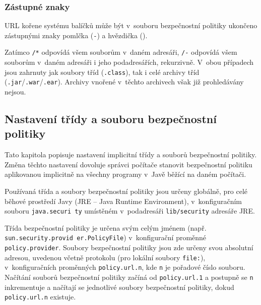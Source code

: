 \subsubsection{Zástupné znaky}

URL kořene systému balíčků může být v~souboru bezpečnostní politiky ukončeno zástupnými znaky pomlčka ({\tt -}) a hvězdička ({\tt *}).

Zatímco {\tt /*} odpovídá všem souborům v~daném adresáři, {\tt /-} odpovídá všem souborům v~daném adresáři i jeho podadresářích, rekurzivně.
V~obou případech jsou zahrnuty jak soubory tříd ({\tt .class}), tak i celé archivy tříd ({\tt .jar}/{\tt .war}/{\tt .ear}).
Archivy vnořené v~těchto archivech však již prohledávány nejsou.
\cite{jdkdocPolicyFiles}

\subsection{Nastavení třídy a souboru bezpečnostní politiky} \label{nastaveniPolitiky}

Tato kapitola popisuje nastavení implicitní třídy a souborů bezpečnostní politiky. Změna těchto nastavení dovoluje správci počítače
stanovit bezpečnostní politiku aplikovanou implicitně na všechny programy v~Javě běžící na daném počítači.

Používaná třída a soubory bezpečnostní politiky jsou určeny globálně, pro celé běhové prostředí Javy (JRE -- Java Runtime Environment),
v~konfiguračním souboru {\tt java.securi ty} umístěném v~podadresáři {\tt lib/security} adresáře JRE.~\cite{refPolicyFiles}

Třída bezpečnostní politiky je určena svým celým jménem (např. {\tt sun.security.provid er.PolicyFile}) v~konfigurační proměnné {\tt policy.provider}.
Soubory bezpečnostní politiky jsou zde určeny svou absolutní adresou, uvedenou včetně protokolu (pro lokální soubory {\tt file:}),
v~konfiguračních proměnných {\tt policy.url.n}, kde {\tt n} je pořadové číslo souboru.
Načítání souborů bezpečnostní politiky začíná od {\tt policy.url.1} a postupně se {\tt n} inkrementuje a načítají se jednotlivé soubory bezpečnostní politiky,
dokud {\tt policy.url.n} existuje.~\cite{refPolicyFiles}

